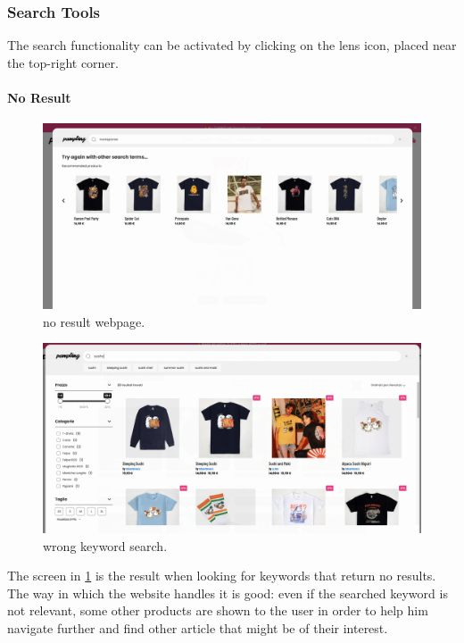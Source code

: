\subsubsection{Search Tools}
The search functionality can be activated by clicking on the lens icon, placed near the top-right corner.


\paragraph{No Result}
\begin{figure}[h!]
	\centering
	\includegraphics[scale=0.225]{images/zero-res.png}
	\caption{no result webpage.}
	\label{fig:zero-res}
\end{figure}

\begin{figure}[h!]
	\centering
	\includegraphics[scale=0.225]{images/wrong-search.png}
	\caption{wrong keyword search.}
	\label{fig:wrong-search}
\end{figure}

The screen in \cref{fig:zero-res} is the result when looking for keywords that return no results.
The way in which the website handles it is good: even if the searched keyword is not relevant, some other products are shown
to the user in order to help him navigate further and find other article that might be of their interest.

